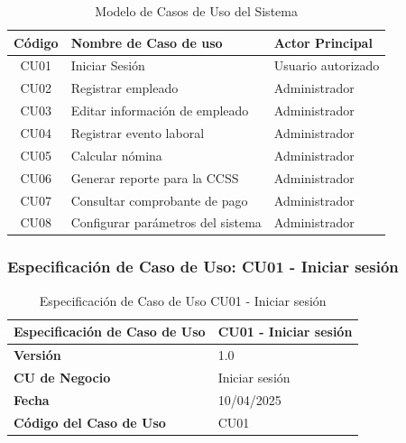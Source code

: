 \begin{table}[h]
	\centering
	\caption{Modelo de Casos de Uso del Sistema}
	\begin{tabular}{|c|p{6cm}|p{5cm}|}
		\hline
		\textbf{Código} & \textbf{Nombre de Caso de uso}    & \textbf{Actor Principal} \\ \hline
		CU01            & Iniciar Sesión                    & Usuario autorizado       \\ \hline
		CU02            & Registrar empleado                & Administrador            \\ \hline
		CU03            & Editar información de empleado    & Administrador            \\ \hline
		CU04            & Registrar evento laboral          & Administrador            \\ \hline
		CU05            & Calcular nómina                   & Administrador            \\ \hline
		CU06            & Generar reporte para la CCSS      & Administrador            \\ \hline
		CU07            & Consultar comprobante de pago     & Administrador            \\ \hline
		CU08            & Configurar parámetros del sistema & Administrador            \\ \hline
	\end{tabular}
\end{table}

\clearpage

\subsubsection*{Especificación de Caso de Uso: CU01 - Iniciar sesión}

\begin{table}[h]
	\centering
	\caption{Especificación de Caso de Uso CU01 - Iniciar sesión}
	\begin{tabular}{|p{5cm}|p{9cm}|}
		\hline
		\textbf{Especificación de Caso de Uso} & CU01 - Iniciar sesión \\ \hline
		\textbf{Versión}                       & 1.0                   \\ \hline
		\textbf{CU de Negocio}                 & Iniciar sesión        \\ \hline
		\textbf{Fecha}                         & 10/04/2025            \\ \hline
		\textbf{Código del Caso de Uso}        & CU01                  \\ \hline
	\end{tabular}
\end{table}

